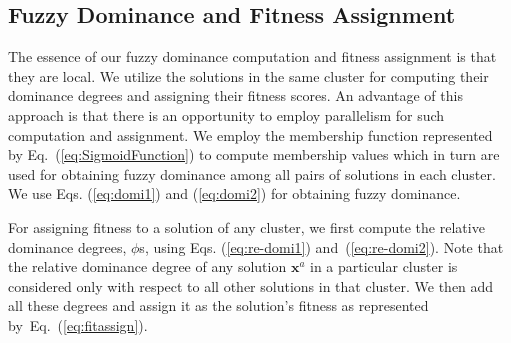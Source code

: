 \documentclass[review]{elsarticle}
\begin{document}
\subsection{Fuzzy Dominance and Fitness Assignment}
The essence of our fuzzy dominance computation and fitness assignment
is that they are local. We utilize the solutions in the same cluster 
for computing their dominance degrees and assigning their fitness scores. An advantage
of this approach is that there is an opportunity to employ parallelism for 
such computation and assignment. %
We employ the membership function represented by Eq.~(\ref{eq:SigmoidFunction}) to compute membership
values which in turn are used for obtaining fuzzy dominance among 
all pairs of solutions in each cluster. We use Eqs. (\ref{eq:domi1}) and (\ref{eq:domi2})
for obtaining fuzzy dominance.

%

For assigning fitness to a solution of any cluster, we first compute the relative dominance degrees, $\phi$s, using Eqs. (\ref{eq:re-domi1}) and~(\ref{eq:re-domi2}). Note that the relative dominance degree of any solution $\textbf{x}^a$  in a particular cluster is considered only with respect to all other solutions in that cluster. 
We then add all these degrees and assign it as the solution's fitness 
as represented by~Eq.~(\ref{eq:fitassign}). 

\end{document}
